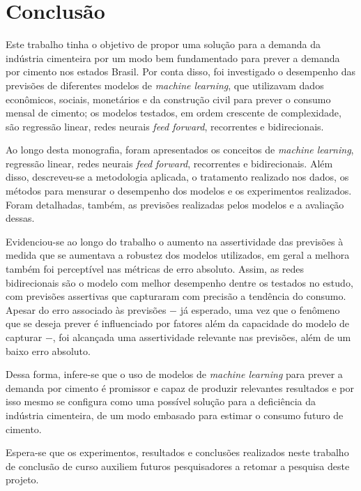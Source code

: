 
\chapter{Conclusão}
\label{chap:conclusao}

Este trabalho tinha o objetivo de propor uma solução para a demanda da indústria cimenteira 
por um modo bem fundamentado para prever a demanda por cimento nos estados Brasil.
Por conta disso, foi investigado o desempenho das previsões de diferentes modelos de \textit{machine learning}, que utilizavam dados econômicos, sociais, monetários e da construção civil 
para prever o consumo mensal de cimento; os modelos testados, em ordem 
crescente de complexidade, são regressão linear, redes neurais \textit{feed 
forward}, recorrentes e bidirecionais. 

Ao longo desta monografia, foram apresentados os conceitos de \textit{machine learning}, regressão linear, redes neurais \textit{feed forward}, 
recorrentes e bidirecionais. Além disso, descreveu-se a metodologia aplicada, 
o tratamento realizado nos dados, os métodos para mensurar o desempenho dos 
modelos e os experimentos realizados. Foram detalhadas, também, as previsões
realizadas pelos modelos e a avaliação dessas.

Evidenciou-se ao longo do trabalho o aumento na assertividade das previsões 
à medida que se aumentava a robustez dos modelos utilizados, em geral a melhora
também foi perceptível nas métricas de erro absoluto. Assim, as redes bidirecionais
são o modelo com melhor desempenho dentre os testados no estudo, com previsões
assertivas que capturaram com precisão a tendência do consumo. Apesar do erro 
associado às previsões $-$ já esperado, uma vez que o fenômeno que se deseja prever 
é influenciado por fatores além da capacidade do modelo de capturar $-$, foi 
alcançada uma assertividade relevante nas previsões, além de um baixo erro 
absoluto.

Dessa forma, infere-se que o uso de modelos de \textit{machine learning} para prever a demanda por cimento é promissor e capaz de produzir relevantes
resultados e por isso mesmo se configura como uma possível solução para a deficiência da
indústria cimenteira, de um modo embasado para estimar o consumo futuro de cimento.


Espera-se que os experimentos, resultados e conclusões realizados 
neste trabalho de conclusão de curso auxiliem futuros pesquisadores a retomar a 
pesquisa deste projeto.
